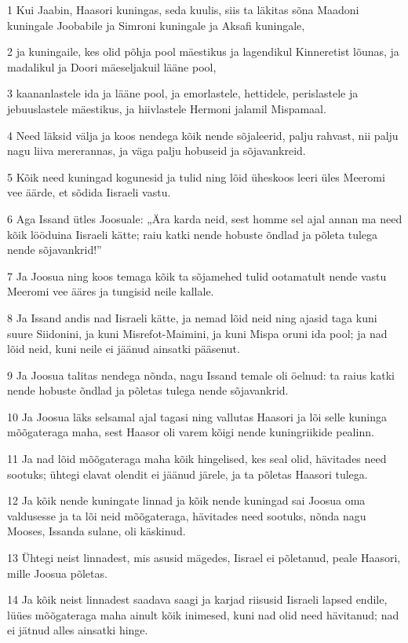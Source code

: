 \par 1 Kui Jaabin, Haasori kuningas, seda kuulis, siis ta läkitas sõna Maadoni kuningale Joobabile ja Simroni kuningale ja Aksafi kuningale,
\par 2 ja kuningaile, kes olid põhja pool mäestikus ja lagendikul Kinneretist lõunas, ja madalikul ja Doori mäeseljakuil lääne pool,
\par 3 kaananlastele ida ja lääne pool, ja emorlastele, hettidele, perislastele ja jebuuslastele mäestikus, ja hiivlastele Hermoni jalamil Mispamaal.
\par 4 Need läksid välja ja koos nendega kõik nende sõjaleerid, palju rahvast, nii palju nagu liiva mererannas, ja väga palju hobuseid ja sõjavankreid.
\par 5 Kõik need kuningad kogunesid ja tulid ning lõid üheskoos leeri üles Meeromi vee äärde, et sõdida Iisraeli vastu.
\par 6 Aga Issand ütles Joosuale: „Ära karda neid, sest homme sel ajal annan ma need kõik lööduina Iisraeli kätte; raiu katki nende hobuste õndlad ja põleta tulega nende sõjavankrid!”
\par 7 Ja Joosua ning koos temaga kõik ta sõjamehed tulid ootamatult nende vastu Meeromi vee ääres ja tungisid neile kallale.
\par 8 Ja Issand andis nad Iisraeli kätte, ja nemad lõid neid ning ajasid taga kuni suure Siidonini, ja kuni Misrefot-Maimini, ja kuni Mispa oruni ida pool; ja nad lõid neid, kuni neile ei jäänud ainsatki pääsenut.
\par 9 Ja Joosua talitas nendega nõnda, nagu Issand temale oli öelnud: ta raius katki nende hobuste õndlad ja põletas tulega nende sõjavankrid.
\par 10 Ja Joosua läks selsamal ajal tagasi ning vallutas Haasori ja lõi selle kuninga mõõgateraga maha, sest Haasor oli varem kõigi nende kuningriikide pealinn.
\par 11 Ja nad lõid mõõgateraga maha kõik hingelised, kes seal olid, hävitades need sootuks; ühtegi elavat olendit ei jäänud järele, ja ta põletas Haasori tulega.
\par 12 Ja kõik nende kuningate linnad ja kõik nende kuningad sai Joosua oma valdusesse ja ta lõi neid mõõgateraga, hävitades need sootuks, nõnda nagu Mooses, Issanda sulane, oli käskinud.
\par 13 Ühtegi neist linnadest, mis asusid mägedes, Iisrael ei põletanud, peale Haasori, mille Joosua põletas.
\par 14 Ja kõik neist linnadest saadava saagi ja karjad riisusid Iisraeli lapsed endile, lüües mõõgateraga maha ainult kõik inimesed, kuni nad olid need hävitanud; nad ei jätnud alles ainsatki hinge.
